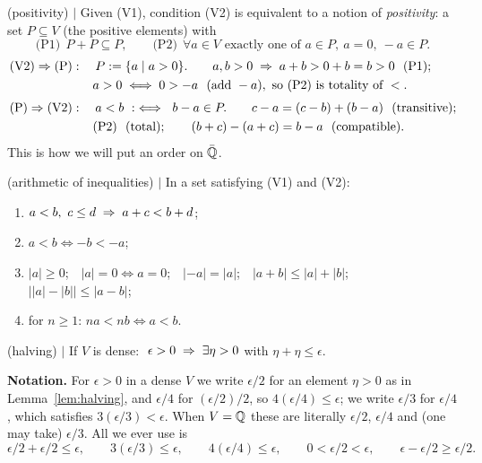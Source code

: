 \begin{remark} (positivity) $\mid$ \label{rem:pos}
Given (V1), condition (V2) is equivalent to a notion of \emph{positivity}: a
set $P\subseteq V$ (the positive elements) with
\[
\text{(P1)}\ \ P+P\subseteq P,
\qquad
\text{(P2)}\ \ \forall a\in V \text{ exactly one of } a\in P,\ a=0,\ -a\in P.
\]
\begin{align*}
&\text{(V2)}\Rightarrow\text{(P)}:\quad P:=\{a\mid a>0\}.\qquad
a,b>0 \imp a+b>0+b=b>0\ \ \text{(P1)};\\
&\qquad\qquad\qquad\ \ a>0 \iff 0>-a\ \ (\text{add } -a),\ \text{so (P2) is totality of } <.\\[3pt]
&\text{(P)}\Rightarrow\text{(V2)}:\quad a<b \ :\iff\ b-a\in P.\qquad
c-a=(c-b)+(b-a)\ \ \text{(transitive)};\\
&\qquad\qquad\qquad\ \ \text{(P2)}\ \ \text{(total)};\qquad (b+c)-(a+c)=b-a\ \ \text{(compatible)}.
\end{align*}
This is how we will put an order on $\bar{\mathbb{Q}}$.
\end{remark}

\begin{lemma} (arithmetic of inequalities) $\mid$ \label{lem:ineq}
In a set satisfying (V1) and (V2):
\begin{enumerate}[nosep,leftmargin=3em]
    \item[(a)] $a<b,\ c\le d \;\Rightarrow\; a+c<b+d$;
    \item[(b)] $a<b\iff -b<-a$;
    \item[(c)] $|a|\ge0$;\ \ $|a|=0\iff a=0$;\ \ $|-a|=|a|$;\ \ $|a+b|\le|a|+|b|$;\ \
    $\big||a|-|b|\big|\le|a-b|$;
    \item[(d)] for $n\ge1$: $na<nb\iff a<b$.
\end{enumerate}
\end{lemma}

\begin{lemma} (halving) $\mid$ \label{lem:halving}
If $V$ is dense: $\ \epsilon>0 \;\Rightarrow\; \exists\eta>0$ with $\eta+\eta\le\epsilon$.
\end{lemma}

\noindent\textbf{Notation.} For $\epsilon>0$ in a dense $V$ we write
$\epsilon/2$ for an element $\eta>0$ as in Lemma~\ref{lem:halving}, and
$\epsilon/4$ for $(\epsilon/2)/2$, so $4(\epsilon/4)\le\epsilon$; we write
$\epsilon/3$ for $\epsilon/4$, which satisfies $3(\epsilon/3)<\epsilon$. When
$V=\mathbb{Q}$ these are literally $\epsilon/2$, $\epsilon/4$ and (one may take)
$\epsilon/3$. All we ever use is
\[
\epsilon/2+\epsilon/2\le\epsilon,\qquad
3(\epsilon/3)\le\epsilon,\qquad
4(\epsilon/4)\le\epsilon,\qquad
0<\epsilon/2<\epsilon,\qquad
\epsilon-\epsilon/2\ge\epsilon/2 .
\]

